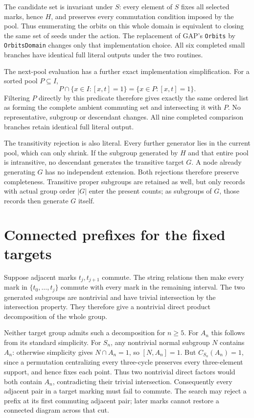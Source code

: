 \documentclass[11pt,a4paper]{article}
\begin{document}
The candidate set is invariant under $S$: every element of $S$ fixes
all selected marks, hence $H$, and preserves every commutation condition
imposed by the pool. Thus enumerating the orbits on this whole domain
is equivalent to closing the same set of seeds under the action.
The replacement of GAP's \texttt{Orbits} by \texttt{OrbitsDomain} changes
only that implementation choice. All six completed small branches have
identical full literal outputs under the two routines.

The next-pool evaluation has a further exact implementation simplification.
For a sorted pool $P\subseteq I$,
\[P\cap\{x\in I:[x,t]=1\}=\{x\in P:[x,t]=1\}.\]
Filtering $P$ directly by this predicate therefore gives exactly the same
ordered list as forming the complete ambient commuting set and intersecting
it with $P$. No representative, subgroup or descendant changes. All nine
completed comparison branches retain identical full literal output.

The transitivity rejection is also literal. Every further generator lies
in the current pool, which can only shrink. If the subgroup generated by
$H$ and that entire pool is intransitive, no descendant generates the
transitive target $G$. A node already generating $G$ has no independent
extension. Both rejections therefore preserve completeness. Transitive
proper subgroups are retained as well, but only records with actual group
order $|G|$ enter the present counts; as subgroups of $G$, those records
then generate $G$ itself.

\section{Connected prefixes for the fixed targets}
Suppose adjacent marks $t_j,t_{j+1}$ commute. The string relations then
make every mark in $\{t_0,\ldots,t_j\}$ commute with every mark in the
remaining interval. The two generated subgroups are nontrivial and have
trivial intersection by the intersection property. They therefore give
a nontrivial direct product decomposition of the whole group.

Neither target group admits such a decomposition for $n\ge5$.
For $A_n$ this follows from its standard simplicity. For $S_n$, any
nontrivial normal subgroup $N$ contains $A_n$: otherwise simplicity gives
$N\cap A_n=1$, so $[N,A_n]=1$. But $C_{S_n}(A_n)=1$, since a permutation
centralizing every three-cycle preserves every three-element support,
and hence fixes each point. Thus two nontrivial direct factors would
both contain $A_n$, contradicting their trivial intersection.
Consequently every adjacent pair in a target marking must fail to
commute. The search may reject a prefix at its first commuting adjacent
pair; later marks cannot restore a connected diagram across that cut.
\end{document}
